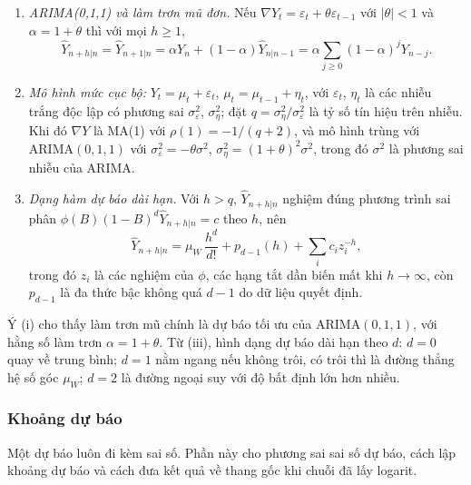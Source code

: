 \begin{kq}
\begin{enumerate}[label=(\roman*),leftmargin=*,itemsep=1pt]
\item \emph{ARIMA(0,1,1) và làm trơn mũ đơn.} Nếu $\nabla Y_t=\varepsilon_t+\theta\varepsilon_{t-1}$ với $|\theta|<1$ và $\alpha=1+\theta$ thì với mọi $h\ge1$,
\[
\hat Y_{n+h|n}=\hat Y_{n+1|n}=\alpha Y_n+(1-\alpha)\hat Y_{n|n-1}=\alpha\sum_{j\ge0}(1-\alpha)^jY_{n-j}.
\]
\item \emph{Mô hình mức cục bộ:} $Y_t=\mu_t+\varepsilon_t$, $\mu_t=\mu_{t-1}+\eta_t$, với $\varepsilon_t$, $\eta_t$ là các nhiễu trắng độc lập có phương sai $\sigma_\varepsilon^2$, $\sigma_\eta^2$; đặt $q=\sigma_\eta^2/\sigma_\varepsilon^2$ là tỷ số tín hiệu trên nhiễu. Khi đó $\nabla Y$ là MA(1) với $\rho(1)=-1/(q+2)$, và mô hình trùng với ARIMA$(0,1,1)$ với $\sigma_\varepsilon^2=-\theta\sigma^2$, $\sigma_\eta^2=(1+\theta)^2\sigma^2$, trong đó $\sigma^2$ là phương sai nhiễu của ARIMA.
\item \emph{Dạng hàm dự báo dài hạn.} Với $h>q$, $\hat Y_{n+h|n}$ nghiệm đúng phương trình sai phân $\phi(B)(1-B)^d\hat Y_{n+h|n}=c$ theo $h$, nên
\[
\hat Y_{n+h|n}=\mu_W\,\frac{h^d}{d!}+p_{d-1}(h)+\sum_ic_iz_i^{-h},
\]
trong đó $z_i$ là các nghiệm của $\phi$, các hạng tắt dần biến mất khi $h\to\infty$, còn $p_{d-1}$ là đa thức bậc không quá $d-1$ do dữ liệu quyết định.
\end{enumerate}
\end{kq}
Ý (i) cho thấy làm trơn mũ chính là dự báo tối ưu của ARIMA$(0,1,1)$, với hằng số làm trơn $\alpha=1+\theta$. Từ (iii), hình dạng dự báo dài hạn theo $d$: $d=0$ quay về trung bình; $d=1$ nằm ngang nếu không trôi, có trôi thì là đường thẳng hệ số góc $\mu_W$; $d=2$ là đường ngoại suy với độ bất định lớn hơn nhiều.

\subsubsection{Khoảng dự báo}

Một dự báo luôn đi kèm sai số. Phần này cho phương sai sai số dự báo, cách lập khoảng dự báo và cách đưa kết quả về thang gốc khi chuỗi đã lấy logarit.

